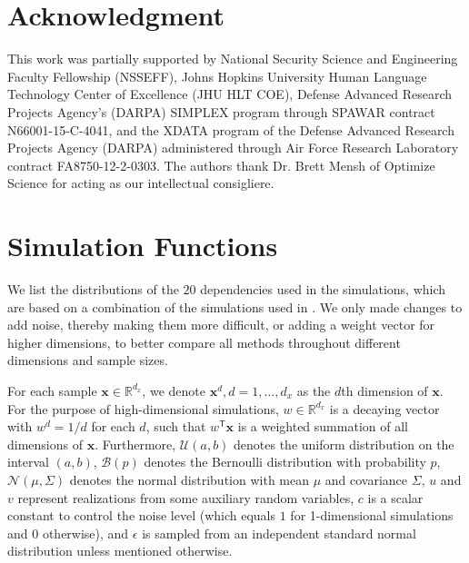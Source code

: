 \documentclass[11pt]{article}
\newcommand{\note}[2][]{\added[#1,remark={#2}]{}}
\providecommand{\sct}[1]{{\sc \texttt{#1}}}
\providecommand{\mb}[1]{\boldsymbol{#1}}
\providecommand{\mc}[1]{\mathcal{#1}}
\newcommand{\Real}{\mathbb{R}}
\newcommand{\T}{^{\ensuremath{\mathsf{T}}}}           %
\newcommand{\Mgc}{\sct{Mgc}}
\newcommand{\cs}[1]{{\note{cs: #1}}}
\newcommand{\mbx}{\ensuremath{\mb{x}}}
\begin{document}






\section*{Acknowledgment}
This work was partially supported by
%
National Security Science and Engineering Faculty Fellowship (NSSEFF),
%
Johns Hopkins University Human Language Technology Center of Excellence (JHU HLT COE),
%
Defense Advanced Research Projects Agency's (DARPA) SIMPLEX program through SPAWAR contract N66001-15-C-4041,
%
and the XDATA program of the Defense Advanced Research Projects Agency (DARPA) administered through Air Force Research Laboratory contract FA8750-12-2-0303. The authors thank Dr. Brett Mensh of Optimize Science for acting as our intellectual consigliere.


\clearpage
\appendix
\setcounter{figure}{0}
\renewcommand\thefigure{A\arabic{figure}}

\section{Simulation Functions}
\label{appen:function}

We list the distributions of the $20$ dependencies used in the simulations, which are based on a combination of the simulations used in \cite{SzekelyRizzoBakirov2007, SimonTibshirani2012, SimonTibshirani2012, GorfineHellerHeller2012}.  We only made changes to add noise, thereby making them more difficult, or adding a weight vector for higher dimensions, %
\cs{is the above true? you had "some changes", which felt vague and suggested we changed things for our favor.} 
to better compare all methods throughout different dimensions and sample sizes.

For each sample $\mbx \in \Real^{d_{x}}$, we denote $\mbx^{d}, d=1,\ldots,d_{x}$ as the $d$th dimension of \mbx. For the purpose of high-dimensional simulations, $w \in \Real^{d_{x}}$ is a decaying vector with $w^{d}=1/d$ for each $d$, such that $w\T \mbx$ is a 
weighted summation of all dimensions of \mbx. %
Furthermore, $\mc{U}(a,b)$ denotes the uniform distribution on the interval $(a,b)$, $\mc{B}(p)$ denotes the Bernoulli distribution with probability $p$, $\mc{N}(\mu,{\Sigma})$ denotes the normal distribution with mean ${\mu}$ and covariance ${\Sigma}$, 
$u$ and $v$ represent realizations from some auxiliary random variables, $c$ is a scalar constant to control the noise level (which equals $1$ for 1-dimensional simulations and $0$ otherwise), and $\epsilon$ is sampled from an independent standard normal distribution unless mentioned otherwise.
\end{document}
